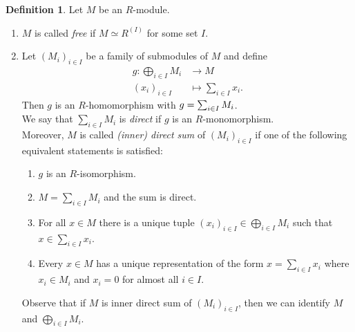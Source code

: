 \documentclass[12pt,a4paper]{report}
\theoremstyle{definition}
\newtheorem{defn}[theorem]{Definition}
\theoremstyle{num.custom-title}
\let\o\relax %
\DeclareMathOperator{\o}{\mathsf{o}}
\let\Im\relax %
\DeclareMathOperator{\Im}{Im}
\begin{document}
\begin{defn}\label{def-free_m-sum_dir}
Let $M$ be an $R$-module.
\begin{enumerate}
\item $M$ is called \emph{free} if $M \simeq R^{(I)}$ for some set $I$.
\item Let $(M_i)_{i \in I}$ be a family of submodules of $M$ and define
\begin{align*}
g \colon \bigoplus_{i \in I} M_i &\to M \\
(x_i)_{i \in I} &\mapsto \sum_{i \in I} x_i.
\end{align*}
Then $g$ is an $R$-homomorphism with $\Im g = \sum_{i \in I} M_i$.\\
We say that $\sum_{i \in I} M_i$ is \emph{direct} if $g$ is an $R$-monomorphism.\\
Moreover, $M$ is called \emph{(inner) direct sum} of $(M_i)_{i \in I}$ if one of the following equivalent statements is satisfied:
\begin{enumerate}
\item $g$ is an $R$-isomorphism.
\item $M=\sum_{i \in I} M_i$ and the sum is direct.
\item For all $x \in M$ there is a unique tuple $(x_i)_{i \in I} \in \bigoplus_{i \in I} M_i$ such that $x \in \sum_{i \in I} x_i$.
\item Every $x \in M$ has a unique representation of the form $x = \sum_{i \in I} x_i$ where $x_i \in M_i$ and $x_i = 0$ for almost all $i \in I$.
\end{enumerate}
Observe that if $M$ is inner direct sum of $(M_i)_{i \in I}$, then we can identify $M$ and $\bigoplus_{i \in I} M_i$.
\end{enumerate}
\end{defn}

\addtocounter{theorem}{-1} %
\end{document}
